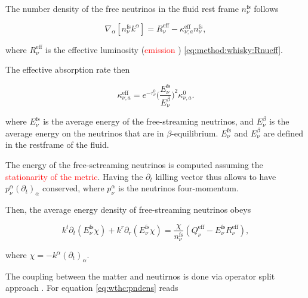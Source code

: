 \documentclass[11pt,a4paper,headinclude=true,DIV=14,BCOR=8mm,chapterprefix,listof=totoc,twoside,openright,abstracton]{scrbook}
\newcommand{\red}[1]{\textcolor{red}{#1}}
\begin{document}
The number density of the free neutrinos in the fluid rest frame $n_{\nu}^{\text{fs}}$ follows \cite{Radice:2016dwd}

\begin{equation}
\label{eq:method:whisky:eq7}
\nabla_{\alpha}[n_{\nu}^{\text{fs}}k^{\alpha}] = R_{\nu}^{\text{eff}} - \kappa_{\nu;a}^{\text{eff}}n_{\nu}^{\text{fs}},
\end{equation}

where $R_{\nu}^{\text{eff}}$ is the effective luminosity (\red{emission }) \eqref{eq:method:whisky:Rnueff}. 

The effective absorption rate then

\begin{equation}
\kappa_{\nu,a}^{\text{eff}} = e^{-\tau_{\nu}^0}\Big( \frac{E_{\nu}^{\text{fs}}}{E_{\nu}^{\beta}} \Big)^2 \kappa_{\nu,a}^0.
\end{equation}

where $E_{\nu}^{\text{fs}}$ is the average energy of the free-streaming neutrinos, and 
$E_{\nu}^{\beta}$ is the average energy on the neutrinos that are in $\beta$-equilibrium.
$E_{\nu}^{\text{fs}}$ and $E_{\nu}^{\beta}$ are defined in the restframe of the fluid.

The energy of the free-sctreaming neutrinos is computed assuming the \red{stationarity of the metric}.
Having the $\partial_t$ killing vector thus allows to have $p_{\nu}^{\alpha}(\partial_t)_{\alpha}$ conserved, 
where $p_{\nu}^{\alpha}$ is the neutrinos four-momentum.

Then, the average energy density of free-streaming neutrinos obeys

\begin{equation}
\label{eq:method:whisky:eq9}
k^t\partial_t(E_{\nu}^{\text{fs}}\chi) + k^{r}\partial_r(E_{\nu}^{\text{fs}}\chi) = \frac{\chi}{n_{\nu}^{\text{fs}}}(Q_{\nu}^{\text{eff}}-E_{\nu}^{\text{fs}}R_{\nu}^{\text{eff}}),
\end{equation}

where $\chi=-k^{\alpha}(\partial_t)_{\alpha}$.

The coupling between the matter and neutirnos is done via operator split approach \cite{Radice:2016dwd}.
For equation \eqref{eq:wthc:pndens} reads
\end{document}
